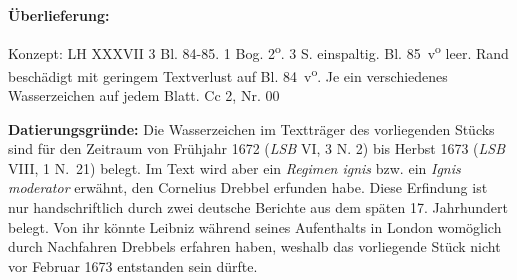 \begin{ledgroupsized}[r]{120mm}%
\footnotesize%
\pstart%
\noindent\textbf{\"{U}berlieferung:}%
\pend%
\end{ledgroupsized}%
%
\begin{ledgroupsized}[r]{114mm}%
\footnotesize%
\pstart%
\parindent -6mm%
%
Konzept: LH XXXVII 3 Bl. 84-85.
1 Bog. 2\textsuperscript{o}. 3 S. einspaltig.
Bl. 85~v\textsuperscript{o} leer.
Rand beschädigt mit geringem Textverlust auf Bl. 84~v\textsuperscript{o}.
Je ein verschiedenes Wasserzeichen auf jedem Blatt.%
\newline%
Cc 2, Nr. 00%
\pend%
\end{ledgroupsized}%
%
\vspace*{5mm}%
\begin{ledgroup}%
\footnotesize%
\pstart%
\noindent%
\footnotesize{%
\textbf{Datierungsgr\"{u}nde:}
Die Wasserzeichen im Textträger des vorliegenden Stücks sind für den Zeit\-raum von Frühjahr 1672 (\cite{01071}\textit{LSB} VI, 3 N. 2) bis Herbst 1673 (\cite{00265}\textit{LSB} VIII, 1 N.~21) belegt.
Im Text wird aber ein \textit{Regimen ignis} bzw. ein \textit{Ignis moderator} erwähnt, den Cornelius Drebbel erfunden habe.
Diese Erfindung ist nur handschriftlich durch zwei deutsche Berichte aus dem späten 17. Jahrhundert belegt.
Von ihr könnte Leibniz während seines Aufenthalts in London womöglich durch Nachfahren Drebbels erfahren haben,
weshalb das vorliegende Stück nicht vor Februar 1673 entstanden sein dürfte. %
}%
\pend%
\end{ledgroup}%
%
\vspace*{8mm}%
\pstart
\noindent
[84~r\textsuperscript{o}]
\pend
\pstart%
\normalsize%
\noindent%
\centering%
